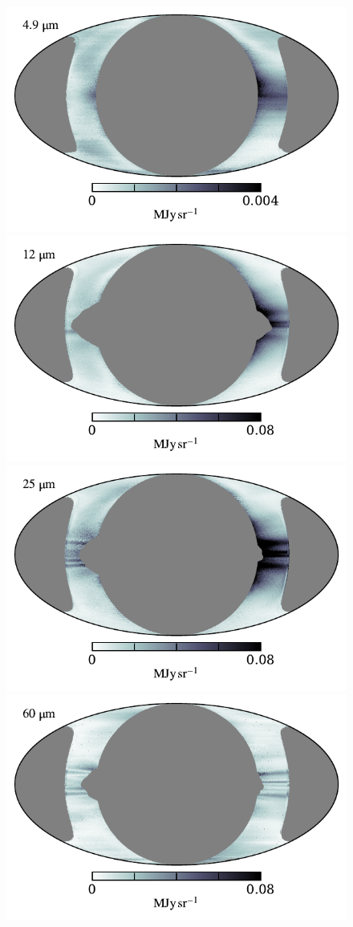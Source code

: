 \documentclass{aa}
\begin{document}
\begin{figure}
  \centering
  \includegraphics[width=0.80\linewidth]{figs/rms_solar_04.pdf}\\
  \includegraphics[width=0.80\linewidth]{figs/rms_solar_05.pdf}\\
  \includegraphics[width=0.80\linewidth]{figs/rms_solar_06.pdf}\\
  \includegraphics[width=0.80\linewidth]{figs/rms_solar_07.pdf}\\

\end{figure}
\end{document}
